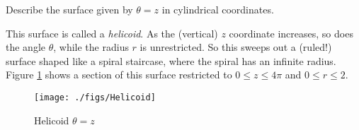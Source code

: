      \begin{exa}\label{exa:helicoid}
 Describe the surface given by $\theta = z$ in cylindrical coordinates.
\end{exa}

\begin{solu}
 This surface is called a \emph{helicoid}. As the (vertical) $z$
 coordinate increases, so does the angle $\theta$, while the radius $r$ is unrestricted. So this sweeps out a (ruled!)
 surface shaped like a spiral staircase, where the spiral has an infinite radius. Figure \ref{fig:helicoid} shows a
 section of this surface restricted to $0 \le z \le 4\pi$ and $0 \le r \le 2$.
\end{solu}


 \begin{figure}[h]
  \begin{center}
   \texttt{[image: ./figs/Helicoid]}
  \end{center}\vspace{-12mm}
 \caption[]{\quad Helicoid $\theta = z$}
 \label{fig:helicoid}
 \end{figure}
\vspace{0.5cm}       
       
